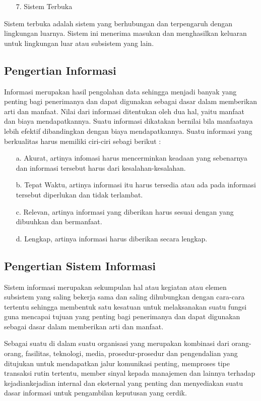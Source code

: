 \documentclass{jtetiproposalskripsi}
\begin{document}
\begin{itemize}
\item[7.] Sistem Terbuka
\end{itemize}
Sistem terbuka adalah sistem yang berhubungan dan terpengaruh dengan lingkungan luarnya. Sistem ini menerima masukan dan menghasilkan keluaran untuk lingkungan luar atau subsistem yang lain.

\subsection{Pengertian Informasi}
Informasi merupakan hasil pengolahan data sehingga menjadi banyak yang penting bagi penerimanya dan dapat digunakan sebagai dasar dalam memberikan arti dan manfaat.
Nilai dari informasi ditentukan oleh dua hal, yaitu manfaat dan biaya mendapatkannya. Suatu informasi dikatakan bernilai bila manfaatnya lebih efektif dibandingkan dengan biaya mendapatkannya.
Suatu informasi yang berkualitas harus memiliki ciri-ciri sebagi berikut :

\begin{itemize}
\item[a.] Akurat, artinya infomasi harus mencerminkan keadaan yang sebenarnya dan informasi tersebut harus dari kesalahan-kesalahan.
\item[b.] Tepat Waktu, artinya informasi itu harus tersedia atau ada pada informasi tersebut diperlukan dan tidak terlambat.
\item[c.] Relevan, artinya informasi yang diberikan harus sesuai dengan yang dibuuhkan dan bermanfaat.
\item[d.] Lengkap, artinya informasi harus diberikan secara lengkap.
\end{itemize}

\subsection{Pengertian Sistem Informasi}
Sistem informasi merupakan sekumpulan hal atau kegiatan atau elemen subsistem yang saling bekerja sama dan saling dihubungkan dengan cara-cara tertentu sehingga membentuk satu kesatuan untuk melaksanakan suatu fungsi guna mencapai tujuan yang penting bagi penerimanya dan dapat digunakan sebagai dasar dalam memberikan arti dan manfaat.

Sebagai suatu di dalam suatu organisasi yang merupakan kombinasi dari orang-orang, fasilitas, teknologi, media, prosedur-prosedur dan pengendalian yang ditujukan untuk mendapatkan jalur komunikasi penting, memproses tipe transaksi rutin tertentu, member sinyal kepada manajemen dan lainnya terhadap kejadiankejadian internal dan eksternal yang penting dan menyediakan suatu dasar informasi untuk pengambilan keputusan yang cerdik.
\end{document}
